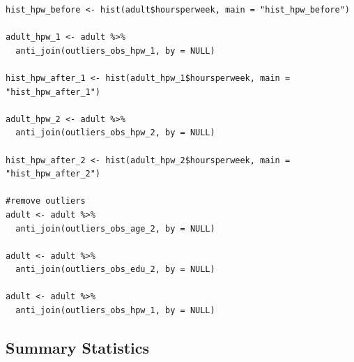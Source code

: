 \documentclass{article}
\begin{document}
\begin{verbatim}
hist_hpw_before <- hist(adult$hoursperweek, main = "hist_hpw_before")

adult_hpw_1 <- adult %>%
  anti_join(outliers_obs_hpw_1, by = NULL)

hist_hpw_after_1 <- hist(adult_hpw_1$hoursperweek, main = "hist_hpw_after_1")

adult_hpw_2 <- adult %>%
  anti_join(outliers_obs_hpw_2, by = NULL)

hist_hpw_after_2 <- hist(adult_hpw_2$hoursperweek, main = "hist_hpw_after_2")

#remove outliers
adult <- adult %>%
  anti_join(outliers_obs_age_2, by = NULL)

adult <- adult %>%
  anti_join(outliers_obs_edu_2, by = NULL)

adult <- adult %>%
  anti_join(outliers_obs_hpw_1, by = NULL)

\end{verbatim}

\subsection{Summary Statistics} \label{sec:sumStatCode}
\end{document}
